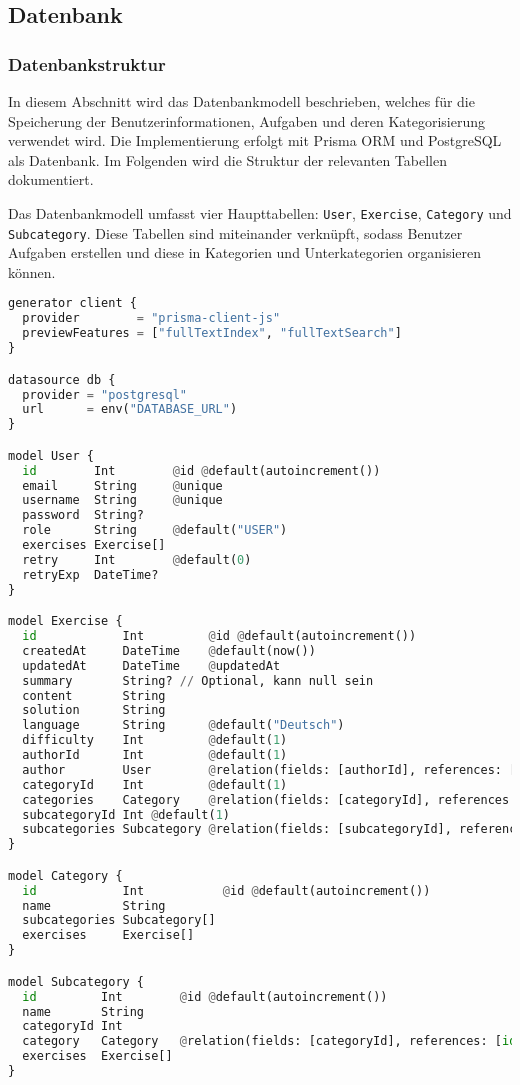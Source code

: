 \subsection{Datenbank}

\subsubsection{Datenbankstruktur}

In diesem Abschnitt wird das Datenbankmodell beschrieben, welches für die Speicherung der Benutzerinformationen, Aufgaben und deren Kategorisierung verwendet wird. Die Implementierung erfolgt mit Prisma ORM und PostgreSQL als Datenbank. Im Folgenden wird die Struktur der relevanten Tabellen dokumentiert.

Das Datenbankmodell umfasst vier Haupttabellen: \texttt{User}, \texttt{Exercise}, \texttt{Category} und \texttt{Subcategory}. Diese Tabellen sind miteinander verknüpft, sodass Benutzer Aufgaben erstellen und diese in Kategorien und Unterkategorien organisieren können.

\newpage
\begin{lstlisting}[language=Python]
  generator client {
  provider        = "prisma-client-js"
  previewFeatures = ["fullTextIndex", "fullTextSearch"]
}

datasource db {
  provider = "postgresql"
  url      = env("DATABASE_URL")
}

model User {
  id        Int        @id @default(autoincrement())
  email     String     @unique
  username  String     @unique 
  password  String?
  role      String     @default("USER")
  exercises Exercise[]
  retry     Int        @default(0)
  retryExp  DateTime?  
}

model Exercise {
  id            Int         @id @default(autoincrement())
  createdAt     DateTime    @default(now())
  updatedAt     DateTime    @updatedAt
  summary       String? // Optional, kann null sein
  content       String
  solution      String
  language      String      @default("Deutsch")
  difficulty    Int         @default(1)
  authorId      Int         @default(1)
  author        User        @relation(fields: [authorId], references: [id])
  categoryId    Int         @default(1)
  categories    Category    @relation(fields: [categoryId], references: [id])
  subcategoryId Int @default(1)
  subcategories Subcategory @relation(fields: [subcategoryId], references: [id])
}

model Category {
  id            Int           @id @default(autoincrement())
  name          String
  subcategories Subcategory[]
  exercises     Exercise[]
}

model Subcategory {
  id         Int        @id @default(autoincrement())
  name       String
  categoryId Int
  category   Category   @relation(fields: [categoryId], references: [id], onDelete: Cascade)
  exercises  Exercise[]
}

\end{lstlisting}




